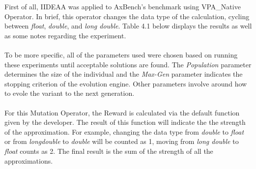 First of all, IIDEAA was applied to AxBench's benchmark using VPA\_Native Operator. In brief, this operator changes the data type of the calculation, cycling between \textit{float}, \textit{double}, and \textit{long double}. Table 4.1 below displays the results as well as some notes regarding the experiment.\\
~\\
To be more specific, all of the parameters used were chosen based on running these experiments until acceptable solutions are found. The \textit{Population} parameter determines the size of the individual and the \textit{Max-Gen} parameter indicates the stopping criterion of the evolution engine. Other parameters involve around how to evole the variant to the next generation.\\
~\\
For this Mutation Operator, the Reward is calculated via the default function given by the developer. The result of this function will indicate the the strength of the approximation. For example, changing the data type from \textit{double} to \textit{float} or from \textit{longdouble} to \textit{double} will be counted as 1, moving from \textit{long double} to \textit{float} counts as 2. The final result is the sum of  the strength of all the approximations. \\
~\\
\newpage
\begingroup
